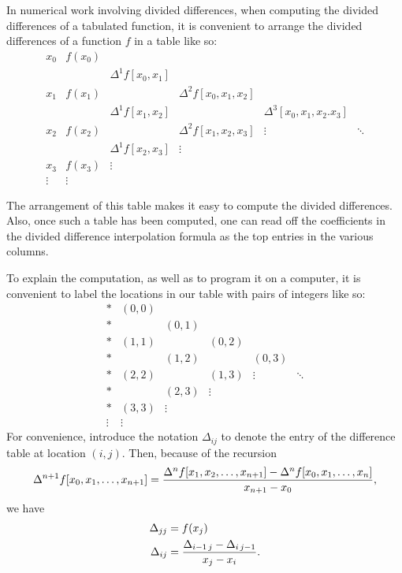 \documentclass[12pt]{article}
\begin{document}
In numerical work involving divided differences, when
computing the divided differences of a tabulated
function, it is convenient to arrange the divided
differences of a function $f$ in a table like so:
\[
\begin{matrix}
x_0 & f(x_0) &&& \\
&& \Delta^1 f[x_0, x_1] && \\
x_1 & f(x_1) && \Delta^2 f[x_0, x_1, x_2] & \\
&& \Delta^1 f[x_1, x_2] && \Delta^3 [x_0, x_1, x_2. x_3] \\
x_2 & f(x_2) && \Delta^2 f[x_1, x_2, x_3] &  \vdots & \ddots \\
&& \Delta^1 f[x_2, x_3] & \vdots & \\
x_3 & f(x_3) & \vdots && \\
\vdots & \vdots &&&
\end{matrix}
\]

The arrangement of this table makes it easy to compute
the divided differences.  Also, once such a table has
been computed, one can read off the coefficients in the
divided difference interpolation formula as the top 
entries in the various columns.

To explain the computation, as well as to program it on a
computer, it is convenient to label the locations in our
table with pairs of integers like so:
\[
\begin{matrix}
* & (0, 0) &&&& \\
* &        & (0, 1) &&& \\
* & (1, 1) &        & (0,2) && \\
* &        & (1, 2) &       & (0, 3) & \\
* & (2, 2) &        & (1,3) & \vdots & \ddots \\
* &        & (2, 3) & \vdots && \\
* & (3, 3) & \vdots &&& \\
\vdots & \vdots &&&&
\end{matrix}
\]
For convenience, introduce the notation $\Delta_{ij}$ to
denote the entry of the difference table at location $(i, j)$.
Then, because of the recursion
\[
\Delta^{n+1} f [x_0, x_1,\ldots, x_{n+1}] = {\Delta^n f [x_1, x_2, \ldots ,x_{n+1}] - \Delta^n f [x_0, x_1 ,\ldots, x_{n}] \over x_{n+1} - x_0},
\]
we have
\begin{align*}
\Delta_{jj} &= f(x_j) \\
\Delta_{ij} &= {\Delta_{i-1\,j} - \Delta_{i\,j-1} \over x_j - x_i}.
\end{align*}
\end{document}
